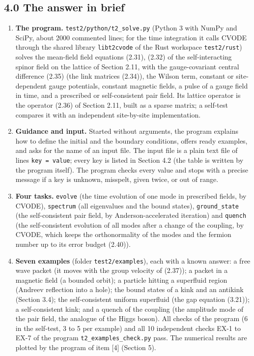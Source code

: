 \documentclass[
  10pt,
]{article}
\providecommand{\tightlist}{%
  \setlength{\itemsep}{0pt}\setlength{\parskip}{0pt}}
\begin{document}
\hypertarget{the-answer-in-brief-2}{%
\subsection{4.0 The answer in brief}\label{the-answer-in-brief-2}}

\begin{enumerate}
\def\labelenumi{\arabic{enumi}.}
\tightlist
\item
  \textbf{The program.} \texttt{test2/python/t2\_solve.py} (Python 3
  with NumPy and SciPy, about 2000 commented lines; for the time
  integration it calls CVODE through the shared library
  \texttt{libt2cvode} of the Rust workspace \texttt{test2/rust}) solves
  the mean-field field equations (2.31), (2.32) of the self-interacting
  spinor field on the lattice of Section 2.11, with the gauge-covariant
  central difference (2.35) (the link matrices (2.34)), the Wilson term,
  constant or site-dependent gauge potentials, constant magnetic fields,
  a pulse of a gauge field in time, and a prescribed or self-consistent
  pair field. Its lattice operator is the operator (2.36) of Section
  2.11, built as a sparse matrix; a self-test compares it with an
  independent site-by-site implementation.
\item
  \textbf{Guidance and input.} Started without arguments, the program
  explains how to define the initial and the boundary conditions, offers
  ready examples, and asks for the name of an input file. The input file
  is a plain text file of lines \texttt{key\ =\ value}; every key is
  listed in Section 4.2 (the table is written by the program itself).
  The program checks every value and stops with a precise message if a
  key is unknown, misspelt, given twice, or out of range.
\item
  \textbf{Four tasks.} \texttt{evolve} (the time evolution of one mode
  in prescribed fields, by CVODE), \texttt{spectrum} (all eigenvalues
  and the bound states), \texttt{ground\_state} (the self-consistent
  pair field, by Anderson-accelerated iteration) and \texttt{quench}
  (the self-consistent evolution of all modes after a change of the
  coupling, by CVODE, which keeps the orthonormality of the modes and
  the fermion number up to its error budget (2.40)).
\item
  \textbf{Seven examples} (folder \texttt{test2/examples}), each with a
  known answer: a free wave packet (it moves with the group velocity of
  (2.37)); a packet in a magnetic field (a bounded orbit); a particle
  hitting a superfluid region (Andreev reflection into a hole); the
  bound states of a kink and an antikink (Section 3.4); the
  self-consistent uniform superfluid (the gap equation (3.21)); a
  self-consistent kink; and a quench of the coupling (the amplitude mode
  of the pair field, the analogue of the Higgs boson). All checks of the
  program (6 in the self-test, 3 to 5 per example) and all 10
  independent checks EX-1 to EX-7 of the program
  \texttt{t2\_examples\_check.py} pass. The numerical results are
  plotted by the program of item {[}4{]} (Section 5).
\end{enumerate}
\end{document}
